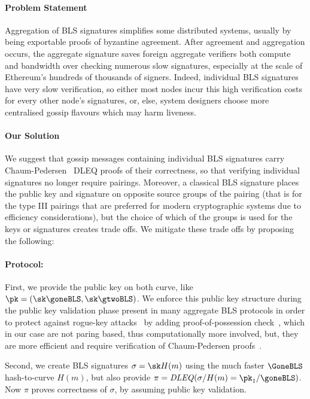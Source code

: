 \paragraph{Problem Statement} Aggregation of BLS signatures simplifies some distributed systems,
usually by being exportable proofs of byzantine agreement. After agreement and aggregation occurs, 
the aggregate signature saves foreign aggregate verifiers both compute and bandwidth over checking
numerous slow signatures, especially at the scale of Ethereum's hundreds of thousands of signers.
Indeed, individual BLS signatures have very slow verification, so either most nodes incur this high verification 
costs for every other node's signatures, or, else, system designers choose more centralised gossip
flavours which may harm liveness.

\paragraph{Our Solution} We suggest that gossip messages containing individual 
BLS signatures carry Chaum-Pedersen~\cite{ChaumPedersen} DLEQ proofs of their correctness, so that 
verifying individual signatures no longer require pairings. Moreover, a classical BLS signature 
places the public key and signature on opposite source groups of the pairing (that is for the type III pairings that 
are preferred for modern cryptographic systems due to efficiency considerations), 
but the choice of which of the groups is used for the keys or signatures creates trade offs. 
We mitigate these trade offs by proposing the following:

\paragraph{Protocol:}
First, we provide the public key on both curve, 
like $\pk = (\sk \goneBLS, \sk \gtwoBLS)$.
We enforce this public key structure during the public key validation
phase present in many aggregate BLS protocols in order to protect against rogue-key attacks~\cite{proofs_of_posession}
by adding proof-of-possession check~\cite{proofs_of_posession}, which in our case are not paring based, thus computationally more involved,  
but, they are more efficient and require verification of Chaum-Pedersen proofs~\cite{chaum_pedersen}.  %

Second, we create BLS signatures $\sigma = \sk H(m)$ using the much
faster $\GoneBLS$ hash-to-curve $H(m)$, but also provide
 $\pi = \mathit{DLEQ}( \sigma / H(m) = \pk_1 / \goneBLS)$.
Now $\pi$ proves correctness of $\sigma$, by
 assuming public key validation.

